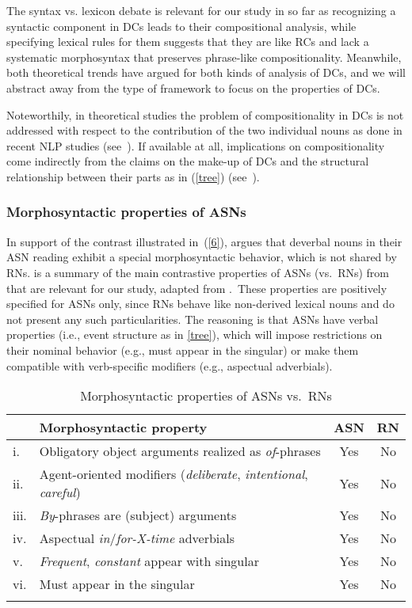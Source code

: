 \documentclass[output=paper]{langsci/langscibook}
\begin{document}
The syntax vs. lexicon debate is relevant for our study in so far as recognizing a syntactic component in DCs leads to their compositional analysis, while specifying lexical rules for them suggests that they are like RCs and lack a systematic morphosyntax that preserves phrase-like compositionality. Meanwhile, both theoretical trends have argued for both kinds of analysis of DCs, and we will abstract away from the type of framework to focus on the properties of DCs.


Noteworthily, in theoretical studies the problem of compositionality in DCs is not addressed with respect to the contribution of the two individual nouns as done in recent NLP studies (see~). If available at all, implications on compositionality come indirectly from the claims on the  make-up of DCs and the structural relationship between their  parts as in (\ref{tree}) (see~).

\subsubsection{Morphosyntactic properties of ASNs}\label{sec:properties:ASN}
 In support of the contrast illustrated in~(\ref{6}), \cite{grimshaw:90}  argues that  deverbal nouns in their ASN reading exhibit a special morphosyntactic behavior, which is not shared by RNs.
 is a summary of the main contrastive properties of ASNs (vs.~RNs) from \cite{grimshaw:90} that are relevant for our study, adapted from \citet[3]{alexiadou:grimshaw:08}.\  These properties are positively specified for ASNs only, since RNs behave like non-derived lexical nouns and do not present any such particularities. The reasoning is that ASNs have  verbal properties (i.e., event structure as in \ref{tree}), which will impose restrictions on their nominal behavior (e.g., must  appear in the singular) or make them compatible with verb-specific modifiers (e.g., aspectual adverbials).

\begin{table}
\caption{Morphosyntactic properties of ASNs vs.\ RNs\label{tab:1:ASN:RN}}
\begin{tabular}{llcc}
\lsptoprule
& Morphosyntactic property & ASN & RN\\\midrule
i. & Obligatory object arguments realized as \textit{of}-phrases & Yes & No \\ 
ii. & Agent-oriented modifiers (\textit{deliberate}, \textit{intentional}, \textit{careful}) & Yes & No\\ 
iii. & \textit{By}-phrases are (subject) arguments &Yes & No\\ 
iv. & Aspectual \textit{in}/\textit{for-X-time} adverbials & Yes & No\\ 
v. &  \textit{Frequent}, \textit{constant} appear with singular & Yes & No\\ 
vi. & Must appear in the singular & Yes & No\\
\lspbottomrule
\end{tabular}
\end{table}
\end{document}
